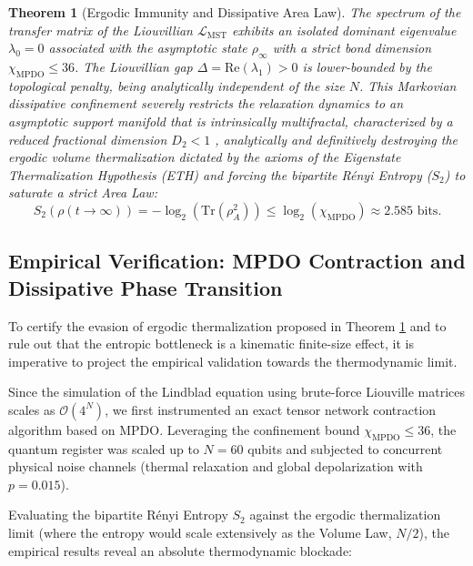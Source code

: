 \documentclass[12pt,a4paper]{article}
\theoremstyle{plain}
\newtheorem{theorem}{Theorem}[section]
\theoremstyle{definition}
\theoremstyle{remark}
\begin{document}
\begin{theorem}[Ergodic Immunity and Dissipative Area Law]
\label{teo:parent_lindbladian}
The spectrum of the transfer matrix of the Liouvillian $\mathcal{L}_{\text{MST}}$ exhibits an isolated dominant eigenvalue $\lambda_0 = 0$ associated with the asymptotic state $\rho_\infty$ with a strict bond dimension $\chi_{\text{MPDO}} \le 36$. The Liouvillian gap $\Delta = \text{Re}(\lambda_1) > 0$ is lower-bounded by the topological penalty, being analytically independent of the size $N$. This Markovian dissipative confinement severely restricts the relaxation dynamics to an asymptotic support manifold that is intrinsically multifractal, characterized by a reduced fractional dimension $D_2 < 1$ \cite{Peinador_Modular_Quantum_Chaos_2026}, analytically and definitively destroying the ergodic volume thermalization dictated by the axioms of the Eigenstate Thermalization Hypothesis (ETH) and forcing the bipartite Rényi Entropy ($S_2$) to saturate a strict Area Law:
\begin{equation}
S_2(\rho(t \to \infty)) = -\log_2(\text{Tr}(\rho_A^2)) \le \log_2(\chi_{\text{MPDO}}) \approx 2.585 \text{ bits}.
\end{equation}
\end{theorem}

\subsection{Empirical Verification: MPDO Contraction and Dissipative Phase Transition}
\label{subsec:verificacion_empirica}

To certify the evasion of ergodic thermalization proposed in Theorem \ref{teo:parent_lindbladian} and to rule out that the entropic bottleneck is a kinematic finite-size effect, it is imperative to project the empirical validation towards the thermodynamic limit. 

Since the simulation of the Lindblad equation using brute-force Liouville matrices scales as $\mathcal{O}(4^N)$, we first instrumented an exact tensor network contraction algorithm based on MPDO. Leveraging the confinement bound $\chi_{\text{MPDO}} \le 36$, the quantum register was scaled up to $N=60$ qubits and subjected to concurrent physical noise channels (thermal relaxation and global depolarization with $p=0.015$).

Evaluating the bipartite Rényi Entropy $S_2$ against the ergodic thermalization limit (where the entropy would scale extensively as the Volume Law, $N/2$), the empirical results reveal an absolute thermodynamic blockade:
\end{document}
